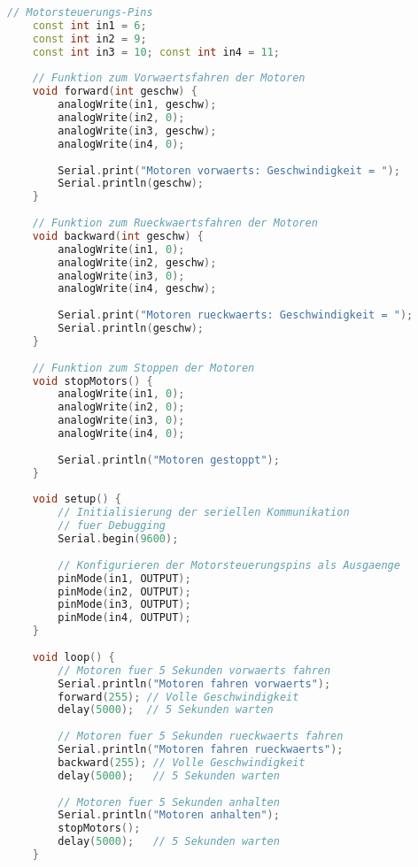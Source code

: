 \begin{lstlisting}[caption=Arduino Motor Test, label=motortest, language=C++]
    // Motorsteuerungs-Pins
    const int in1 = 6;
    const int in2 = 9;
    const int in3 = 10;	const int in4 = 11;
    
    // Funktion zum Vorwaertsfahren der Motoren
    void forward(int geschw) {
        analogWrite(in1, geschw);
        analogWrite(in2, 0);
        analogWrite(in3, geschw);
        analogWrite(in4, 0);
        
        Serial.print("Motoren vorwaerts: Geschwindigkeit = ");
        Serial.println(geschw);
    }
    
    // Funktion zum Rueckwaertsfahren der Motoren
    void backward(int geschw) {
        analogWrite(in1, 0);
        analogWrite(in2, geschw);
        analogWrite(in3, 0);
        analogWrite(in4, geschw);
        
        Serial.print("Motoren rueckwaerts: Geschwindigkeit = ");
        Serial.println(geschw);
    }
    
    // Funktion zum Stoppen der Motoren
    void stopMotors() {
        analogWrite(in1, 0);
        analogWrite(in2, 0);
        analogWrite(in3, 0);
        analogWrite(in4, 0);
        
        Serial.println("Motoren gestoppt");
    }
    
    void setup() {
        // Initialisierung der seriellen Kommunikation 
        // fuer Debugging
        Serial.begin(9600);
        
        // Konfigurieren der Motorsteuerungspins als Ausgaenge
        pinMode(in1, OUTPUT);
        pinMode(in2, OUTPUT);
        pinMode(in3, OUTPUT);
        pinMode(in4, OUTPUT);
    }
    
    void loop() {
        // Motoren fuer 5 Sekunden vorwaerts fahren
        Serial.println("Motoren fahren vorwaerts");
        forward(255); // Volle Geschwindigkeit
        delay(5000);  // 5 Sekunden warten
        
        // Motoren fuer 5 Sekunden rueckwaerts fahren
        Serial.println("Motoren fahren rueckwaerts");
        backward(255); // Volle Geschwindigkeit
        delay(5000);   // 5 Sekunden warten
        
        // Motoren fuer 5 Sekunden anhalten
        Serial.println("Motoren anhalten");
        stopMotors();
        delay(5000);   // 5 Sekunden warten
    }
    
\end{lstlisting}

